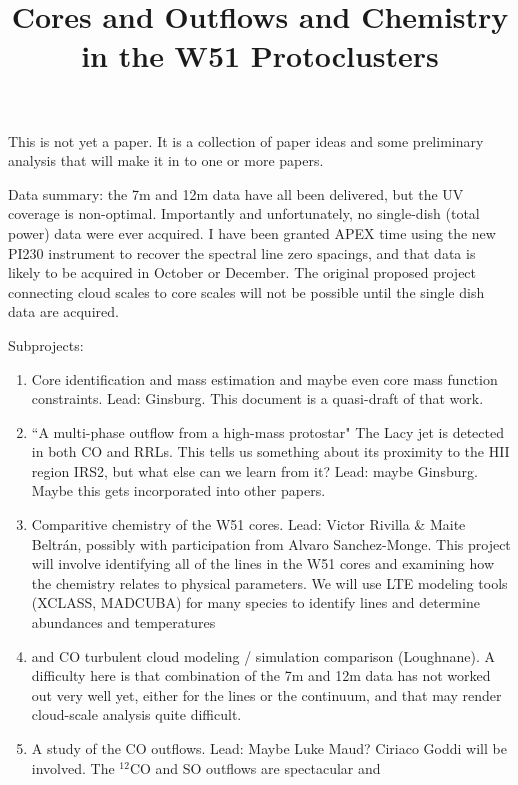 \documentclass{aa}
\begin{document}
\title{Cores and Outflows and Chemistry in the W51 Protoclusters}

This is not yet a paper.  It is a collection of paper ideas and some 
preliminary analysis that will make it in to one or more papers.

Data summary: the 7m and 12m data have all been delivered, but the UV coverage
is non-optimal.  Importantly and unfortunately, no single-dish (total power)
data were ever acquired.  I have been granted APEX time using the new
PI230 instrument to recover the spectral line zero spacings, and that data is likely
to be acquired in October or December.  The original proposed project connecting
cloud scales to core scales will not be possible until the single dish data are
acquired.


Subprojects:
\begin{enumerate}
    \item Core identification and mass estimation and maybe even
        core mass function constraints.  Lead: Ginsburg.  This document
        is a quasi-draft of that work.
    \item ``A multi-phase outflow from a high-mass protostar"
        The Lacy jet is detected in both CO and RRLs.  This tells us something
        about its proximity to the HII region IRS2, but what else can we learn
        from it?  Lead: maybe Ginsburg.  Maybe this gets incorporated
        into other papers.
    \item Comparitive chemistry of the W51 cores.  Lead: Victor Rivilla \&
        Maite Beltr{\'a}n, possibly with participation from Alvaro
        Sanchez-Monge.
        This project will involve identifying all of the lines in the W51 cores
        and examining how the chemistry relates to physical parameters.
        We will use LTE modeling tools (XCLASS, MADCUBA) for many species to
        identify lines and determine abundances and temperatures
    \item \formaldehyde and CO turbulent cloud modeling / simulation comparison
        (Loughnane).  A difficulty here is that combination of the 7m and 12m
        data has not worked out very well yet, either for the lines or the
        continuum, and that may render cloud-scale analysis quite difficult.
    \item A study of the CO outflows.  Lead: Maybe Luke Maud?  Ciriaco Goddi
        will be involved.  The $^{12}$CO and SO outflows are spectacular and

\end{enumerate}
\end{document}
